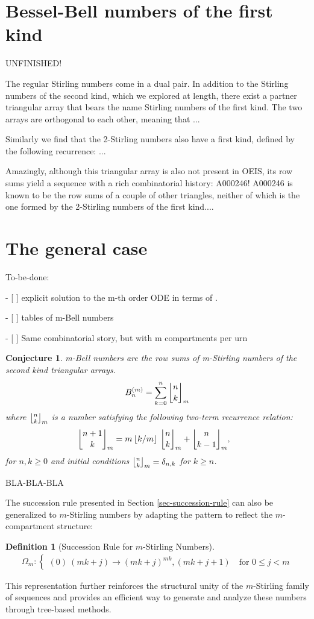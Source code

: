 \documentclass[a4paper]{amsart}
\newcommand{\mStirling}[0]{\genfrac{\lfloor}{\rfloor}{0pt}{}}
\newcommand{\floor}[1]{\left\lfloor #1 \right\rfloor}
\newtheorem{definition}[theorem]{Definition}
\newtheorem{conjecture}[theorem]{Conjecture}
\begin{document}
\section{Bessel-Bell numbers of the first kind}

UNFINISHED!

The regular Stirling numbers come in a dual pair. In addition to the Stirling numbers of the second kind, which we explored at length, there exist a partner triangular array that bears the name Stirling numbers of the first kind. The two arrays are orthogonal to each other, meaning that ...

Similarly we find that the 2-Stirling numbers also have a first kind, defined by the following recurrence: ...

Amazingly, although this triangular array is also not present in OEIS, its row sums yield a sequence with a rich combinatorial history: A000246! A000246 is known to be the row sums of a couple of other triangles, neither of which is the one formed by the 2-Stirling numbers of the first kind....


\section{The general case}\label{sec-general-case}
To-be-done:

- [ ] explicit solution to the m-th order ODE in terms of \cite{tauberGeneralizationsExponentialFunction1960}.

- [ ] tables of m-Bell numbers

- [ ] Same combinatorial story, but with m compartments per urn

\begin{conjecture} m-Bell numbers are the row sums of m-Stirling numbers of the second kind triangular arrays.
\[
B_{n}^{(m)} = \sum_{k=0}^n \mStirling{n}{k}_m
\]
where $\mStirling{n}{k}_m$ is a number satisfying the following two-term recurrence relation:
\[
\mStirling{n+1}{k}_m = m\floor{k/m} \, \genfrac{\lfloor}{\rfloor}{0pt}{}{n}{k}_m + \genfrac{\lfloor}{\rfloor}{0pt}{}{n}{k-1}_m, \,\,\,\,\,
\]
for $n, k \ge 0$ and initial conditions $\genfrac{\lfloor}{\rfloor}{0pt}{}{n}{k}_m = \delta_{n,k}$ for $k\ge n$.
\end{conjecture}

BLA-BLA-BLA

The succession rule presented in Section \ref{sec-succession-rule} can also be generalized to $m$-Stirling numbers by adapting the pattern to reflect the $m$-compartment structure:
\begin{definition}[Succession Rule for $m$-Stirling Numbers]
\begin{align}
\Omega_m: \begin{cases}
(0) \
(mk+j) \to (mk+j)^{mk} , (mk+j+1) \quad \text{for } 0 \leq j < m
\end{cases}
\end{align}
\end{definition}
This representation further reinforces the structural unity of the $m$-Stirling family of sequences and provides an efficient way to generate and analyze these numbers through tree-based methods.
\end{document}
